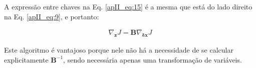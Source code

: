 A expressão entre chaves na Eq. \ref{apII_eq:15} é a mesma que está do lado direito na Eq. \ref{apII_eq:9}, e portanto:

\begin{equation}
\label{apII_eq:16}
  \begin{split}
\nabla_{\mathbf{z}}J = \mathbf{B} \nabla_{\mathbf{\delta{x}}}J
  \end{split}
\end{equation}

Este algoritmo é vantajoso porque nele não há a necessidade de se calcular explicitamente $\mathbf{B}^{-1}$, sendo necessária apenas uma transformação de variáveis.